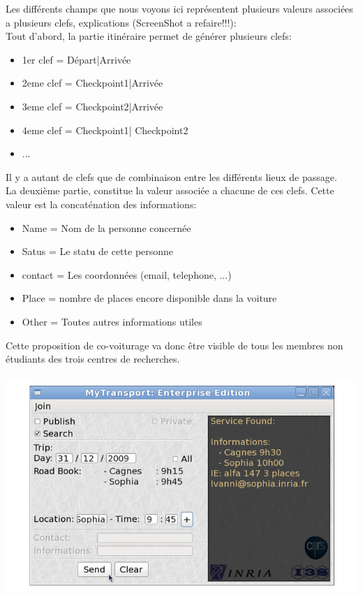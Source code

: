 Les différents champs que nous voyons ici représentent plusieurs valeurs associées a plusieurs clefs, explications (ScreenShot a refaire!!!):\\

Tout d'abord, la partie itinéraire permet de générer plusieurs clefs:
\begin{itemize}
\item 1er clef = Départ|Arrivée
\item 2eme clef = Checkpoint1|Arrivée
\item 3eme clef = Checkpoint2|Arrivée
\item 4eme clef =  Checkpoint1| Checkpoint2
\item ... 
\end{itemize}
Il y a autant de clefs que de combinaison entre les différents lieux de passage.\\ 

La deuxième partie, constitue la valeur associée a chacune de ces clefs. Cette valeur est la concaténation des informations:
\begin{itemize}
\item Name = Nom de la personne concernée
\item Satus = Le statu de cette personne
\item contact = Les coordonnées (email, telephone, ...)
\item Place = nombre de places encore disponible dans la voiture
\item Other = Toutes autres informations utiles \\
\end{itemize}

Cette proposition de co-voiturage va donc être visible de tous les membres non étudiants des trois centres de recherches. \\

~~~~~~~~~ \includegraphics[scale=0.4]{img/screenshot/enterpriseSub}\\

